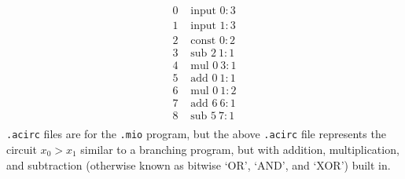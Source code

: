 \documentclass[12pt,twoside]{reedthesis}
\begin{document}
   \newcommand{\sub}[0]{\text{ sub }}
   \newcommand{\mul}[0]{\text{ mul }}
   \begin{align*}
   0 &\text{ input } 0 : 3 \\
1 &\text{ input } 1 : 3\\
2 &\text{ const } 0 : 2 \\
3 &\sub 2\ 1 : 1 \\
4 &\mul 0\ 3 : 1\\
5 &\text{ add } 0\ 1 : 1\\
6 &\mul 0\ 1 : 2\\
7 &\text{ add } 6\ 6 : 1\\
8 &\sub 5\ 7 : 1\\
   \end{align*} 
   \texttt{.acirc} files are for the \texttt{.mio} program, but the above \texttt{.acirc} file represents the circuit $x_0 > x_1$ similar to a branching program, but with addition, multiplication, and subtraction (otherwise known as bitwise `OR', `AND', and `XOR') built in.
         
         
\end{document}

